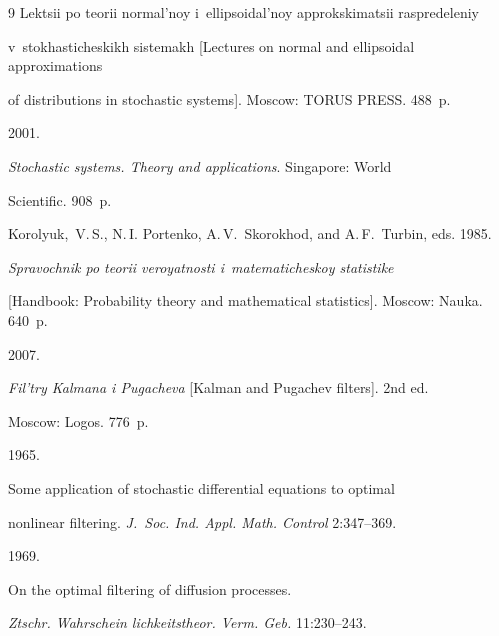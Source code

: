 {{\begin{thebibliography}{9}
Lektsii po teorii normal'noy i~ellipsoidal'noy approkskimatsii raspredeleniy 

v~stokhasticheskikh sistemakh [Lectures on normal and ellipsoidal approximations 

of distributions in stochastic systems].  Moscow: TORUS PRESS. 488~p.






  2001.

\textit{Stochastic systems. Theory and  applications}. Singapore: World

Scientific. 908~p.




Korolyuk,~V.\,S.,  N.\,I. Portenko, A.\,V.~Skorokhod, and A.\,F.~Turbin, eds. 1985. 

\textit{Spravochnik po teorii veroyatnosti i~matematicheskoy statistike}

[Handbook: Probability theory and mathematical statistics]. Moscow: Nauka. 640~p.




 2007.

\textit{Fil'try Kalmana i Pugacheva} [Kalman and Pugachev filters]. 2nd ed. 

Moscow: Logos. 776~p.




 1965.

Some application of stochastic differential equations to optimal 

nonlinear filtering. \textit{J.~Soc. Ind. Appl. Math. Control} 2:347--369.




 1969.

On the optimal filtering of diffusion processes.

\textit{Ztschr. Wahrschein lichkeitstheor. Verm. Geb.} 11:230--243.

\end{thebibliography}

} }





\vspace*{-1pt}



